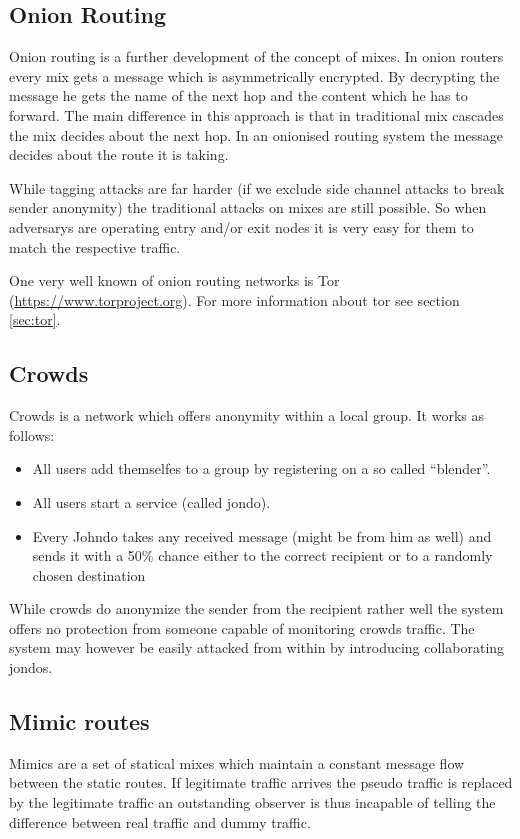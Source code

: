 \subsection{Onion Routing}
Onion routing is a further development of the concept of mixes. In onion routers every mix gets a message which is asymmetrically encrypted. By decrypting the message he gets the name of the next hop and the content which he has to forward. The main difference in this approach is that in traditional mix cascades the mix decides about the next hop. In an onionised routing system the message decides about the route it is taking. 

While tagging attacks are far harder (if we exclude side channel attacks to break sender anonymity) the traditional attacks on mixes are still possible. So when adversarys are operating entry and/or exit nodes it is very easy for them to match the respective traffic.

One very well known of onion routing networks is Tor (\href{https://www.torproject.org}{https://www.torproject.org}). For more information about tor see section \ref{sec:tor}.


\subsection{Crowds}
Crowds is a network which offers anonymity within a local group. It works as follows:
\begin{itemize}
	\item All users add themselfes to a group by registering on a so called ``blender''.
	\item All users start a service (called jondo).
	\item Every Johndo takes any received message (might be from him as well) and sends it with a 50\% chance either to the correct recipient or to a randomly chosen destination
\end{itemize}
While crowds do anonymize the sender from the recipient rather well the system offers no protection from someone capable of monitoring crowds traffic. The system may however be easily attacked from within by introducing collaborating jondos. 


\subsection{Mimic routes}
Mimics are a set of statical mixes which maintain a constant message flow between the static routes. If legitimate traffic arrives the pseudo traffic is replaced by the legitimate traffic an outstanding observer is thus incapable of telling the difference between real traffic and dummy traffic.

